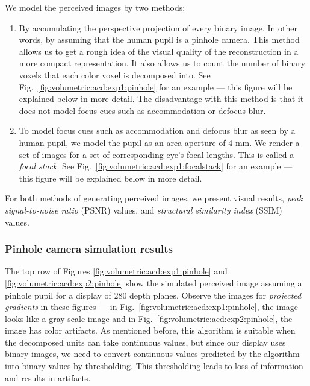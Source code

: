 We model the perceived images by two methods:
\begin{enumerate}
\item By accumulating the perspective projection of every binary image. In other words, by assuming that the human pupil is a pinhole camera. This method allows us to get a rough idea of the visual quality of the reconstruction in a more compact representation. It also allows us to count the number of binary voxels that each color voxel is decomposed into. See Fig.~\ref{fig:volumetric:acd:exp1:pinhole} for an example --- this figure will be explained below in more detail. The disadvantage with this method is that it does not model focus cues such as accommodation or defocus blur.
\item To model focus cues such as accommodation and defocus blur as seen by a human pupil, we model the pupil as an area aperture of 4 mm. We render a set of images for a set of corresponding eye's focal lengths. This is called a \emph{focal stack}. See Fig.~\ref{fig:volumetric:acd:exp1:focalstack} for an example --- this figure will be explained below in more detail.
\end{enumerate}

For both methods of generating perceived images, we present visual results, \emph{peak signal-to-noise ratio} (PSNR) values, and \emph{structural similarity index} (SSIM) values. 

\subsubsection{Pinhole camera simulation results}





The top row of Figures \ref{fig:volumetric:acd:exp1:pinhole} and \ref{fig:volumetric:acd:exp2:pinhole} show the simulated perceived image assuming a pinhole pupil for a display of 280 depth planes. Observe the images for \emph{projected gradients} in these figures --- in Fig.~\ref{fig:volumetric:acd:exp1:pinhole}, the image looks like a gray scale image and in Fig.~\ref{fig:volumetric:acd:exp2:pinhole}, the image has color artifacts. As mentioned before, this algorithm is suitable when the decomposed units can take continuous values, but since our display uses binary images, we need to convert continuous values predicted by the algorithm into binary values by thresholding. This thresholding leads to loss of information and results in artifacts. 

